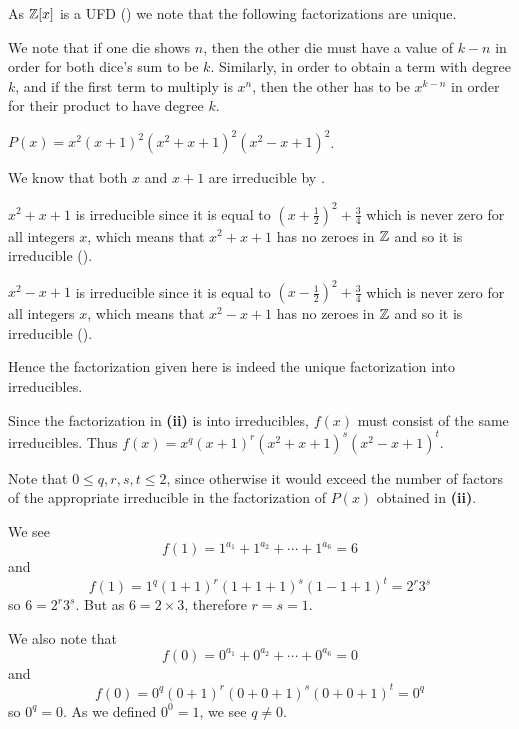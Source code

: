 \begin{questions}
    \item As $\mathbb{Z}[x]$ is a UFD () we note that the following factorizations are unique.
    \begin{partquestions}{\roman*}
        \item We note that if one die shows $n$, then the other die must have a value of $k - n$ in order for both dice's sum to be $k$. Similarly, in order to obtain a term with degree $k$, and if the first term to multiply is $x^n$, then the other has to be $x^{k-n}$ in order for their product to have degree $k$.

        \item $P(x) = x^2(x+1)^2(x^2+x+1)^2(x^2-x+1)^2$.

        We know that both $x$ and $x+1$ are irreducible by .

        $x^2+x+1$ is irreducible since it is equal to $(x+\frac12)^2 + \frac34$ which is never zero for all integers $x$, which means that $x^2+x+1$ has no zeroes in $\mathbb{Z}$ and so it is irreducible ().

        $x^2-x+1$ is irreducible since it is equal to $(x-\frac12)^2 + \frac34$ which is never zero for all integers $x$, which means that $x^2-x+1$ has no zeroes in $\mathbb{Z}$ and so it is irreducible ().

        Hence the factorization given here is indeed the unique factorization into irreducibles.

        \item Since the factorization in \textbf{(ii)} is into irreducibles, $f(x)$ must consist of the same irreducibles. Thus $f(x) = x^q(x+1)^r(x^2+x+1)^s(x^2-x+1)^t$.

        Note that $0 \leq q,r,s,t \leq 2$, since otherwise it would exceed the number of factors of the appropriate irreducible in the factorization of $P(x)$ obtained in \textbf{(ii)}.

        \item We see
        \[
            f(1) = 1^{a_1} + 1^{a_2} + \cdots + 1^{a_6} = 6
        \]
        and
        \[
            f(1) = 1^q(1+1)^r(1+1+1)^s(1-1+1)^t = 2^r3^s
        \]
        so $6 = 2^r3^s$. But as $6 = 2 \times 3$, therefore $r = s = 1$.

        We also note that
        \[
            f(0) = 0^{a_1} + 0^{a_2} + \cdots + 0^{a_6} = 0
        \]
        and
        \[
            f(0) = 0^q(0+1)^r(0+0+1)^s(0+0+1)^t = 0^q
        \]
        so $0^q = 0$. As we defined $0^0 = 1$, we see $q \neq 0$.


\end{partquestions}
\end{questions}
